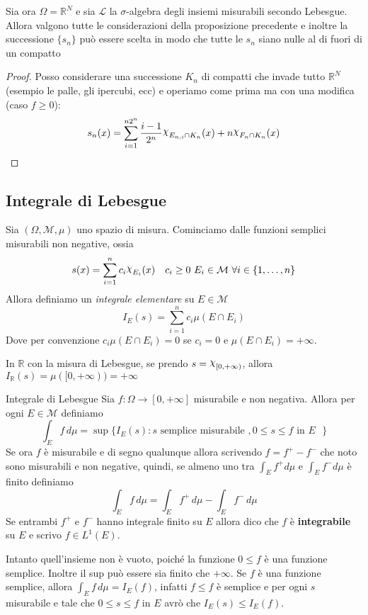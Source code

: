 \begin{lemma}\label{le:nulle_fuori_compatti}
Sia ora \(\Omega = \mathbb{R}^{N}\) e sia \(\mathcal{L}\) la \(\sigma\)-algebra
degli insiemi misurabili secondo Lebesgue. Allora valgono tutte le
considerazioni della proposizione precedente e inoltre la successione
\(\{s_{n}\} \) può essere scelta in modo che tutte le \(s_{n}\) siano nulle al
di fuori di un compatto 
\end{lemma}
\begin{proof}
    Posso considerare una successione \(K_{n}\) di compatti che invade tutto
    \(\mathbb{R}^{N}\) (esempio le palle, gli ipercubi, ecc) e operiamo come
    prima ma con una modifica (caso \(f \ge 0\)):
    \[
        s_{n}(x) = \sum_{i=1}^{n{2}^{n}} \frac{i-1}{2^{n}} \rchi_{E_{n, i} \cap
        K_{n}}(x) +
        n \rchi_{F_{n} \cap K_{n}}(x)
    \]
\end{proof}

\subsection{Integrale di Lebesgue}
Sia \((\Omega, \mathcal{M}, \mu)\) uno spazio di misura. Cominciamo dalle
funzioni semplici misurabili non negative, ossia
\[
    s(x) = \sum_{i=1}^{n} c_{i} \rchi_{E_{i}}(x) \quad c_{i} \ge 0 \,\,
    E_{i} \in \mathcal{M} \,\, \forall i \in \{1, \dots, n\}
\]
Allora definiamo un \emph{integrale elementare} su \(E \in \mathcal{M}\) 
\[
    I_E(s) = \sum_{i=1}^{n} c_{i} \mu(E \cap E_{i})
\]
Dove per convenzione \(c_{i}\mu(E \cap E_{i}) = 0\) se \(c_{i} = 0\) e \(\mu(E
\cap E_{i}) = +\infty\). 
\begin{example}
    In \(\mathbb{R}\) con la misura di Lebesgue, se prendo \(s = \rchi_{[0,
    +\infty)}\), allora \(I_{\mathbb{R}}(s) = \mu([0, +\infty)) = +\infty \) 
\end{example}
\begin{definition}{Integrale di Lebesgue}
    Sia \(f: \Omega \to [0, +\infty]\) misurabile e non negativa. Allora per
    ogni \(E \in \mathcal{M}\) definiamo 
    \[
        \int_E f \, d\mu = \sup \{I_{E}(s) : s \text{ semplice misurabile }, 0 \le s \le f
        \text{ in \(E\) }\}
    \]
Se ora \(f\) è misurabile e di segno qualunque allora scrivendo \(f = f^{+} -
f^{-}\) che noto sono misurabili e non negative, quindi, se almeno uno tra
\(\int_E f^{+} d\mu\) e \(\int_E f^{-} d\mu\) è finito definiamo
\[
    \int_{E} f \, d\mu = \int_{E} f^{+} \, d\mu - \int_{E} f^{-} \, d\mu
\]
Se entrambi \(f^{+}\) e \(f^{-}\) hanno integrale finito su \(E\) allora dico
che \(f\) è \textbf{integrabile} su \(E\) e scrivo \(f \in L^{1}(E)\).
\end{definition}
Intanto quell'insieme non è vuoto, poiché la funzione \(0 \le f\) è una funzione
semplice. Inoltre il sup può essere sia finito che \(+\infty\). Se \(f\) è una
funzione semplice, allora \(\int_{E} f \, d\mu = I_{E}(f)\), infatti \(f \le f\)
è semplice e per ogni \(s\) misurabile e tale che \(0 \le s\le f\) in \(E\) avrò
che \(I_E(s) \le I_E(f)\).

